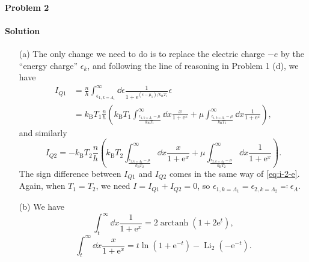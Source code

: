 \documentclass[hyperref, a4paper]{article}
\DeclareMathOperator{\polylog}{\mathrm{Li}}
\DeclareMathOperator{\arctanh}{\mathrm{arctanh}}
\newcommand*{\ee}{\mathrm{e}}
\begin{document}
\paragraph{Problem 2}

\paragraph{Solution} \begin{itemize}
\item[(a)] The only change we need to do is to replace the electric charge $-e$ 
by the ``energy charge'' $\epsilon_{k}$, and following the line of reasoning in Problem 1 (d), 
we have 
\begin{equation}
    \begin{aligned}
        I_{Q1} &= \frac{n}{h} \int^\infty_{\epsilon_{1, k = \Lambda_1}} \dd{\epsilon}  
        \frac{1}{1 + \ee^{(\epsilon - \mu_1) / k_{\text{B}} T_1}}
        \epsilon \\
        &= k_{\text{B}} T_1 \frac{n}{h} 
        \left(
            k_{\text{B}} T_1 \int^\infty_{\frac{\epsilon_{1, k = \Lambda_1} - \mu}{k_{\text{B}} T_1}} \dd{x}
            \frac{x}{1 + \ee^x}
            + \mu \int^\infty_{\frac{\epsilon_{1, k = \Lambda_1} - \mu}{k_{\text{B}} T_1}} \dd{x}
            \frac{1}{1 + \ee^x}
        \right),
    \end{aligned}
\end{equation}
and similarly 
\begin{equation}
    I_{Q2} = - k_{\text{B}} T_2 \frac{n}{h} 
    \left(
        k_{\text{B}} T_2 \int^\infty_{\frac{\epsilon_{2, k = \Lambda_2} - \mu}{k_{\text{B}} T_2}} \dd{x}
        \frac{x}{1 + \ee^x}
        + \mu \int^\infty_{\frac{\epsilon_{2, k = \Lambda_2} - \mu}{k_{\text{B}} T_2}} \dd{x}
        \frac{1}{1 + \ee^x}
    \right).
\end{equation}
The sign difference between $I_{Q1}$ and $I_{Q2}$ comes in the same way of \eqref{eq:i-2-e}.
Again, when $T_1 = T_2$, 
we need $I = I_{Q1} + I_{Q2} = 0$, 
so $\epsilon_{1, k=\Lambda_1} = \epsilon_{2, k=\Lambda_2} \eqqcolon \epsilon_\Lambda$.

\item[(b)] We have 
\begin{equation}
    \int_{t}^\infty \dd{x} \frac{1}{1 + \ee^x} = 2 \arctanh (1 + 2 \ee^t),
\end{equation}
\begin{equation}
    \int_{t}^\infty \dd{x} \frac{x}{1 + \ee^x} = t \ln(1 + \ee^{-t}) - \polylog_2(- \ee^{-t}).
\end{equation}


\end{itemize}
\end{document}
